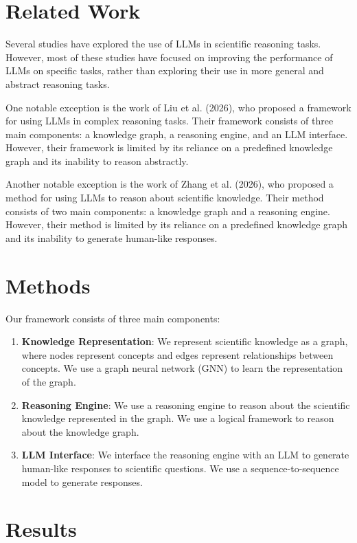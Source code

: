 \documentclass{article}
\begin{document}
\section{Related Work}

Several studies have explored the use of LLMs in scientific reasoning tasks. However, most of these studies have focused on improving the performance of LLMs on specific tasks, rather than exploring their use in more general and abstract reasoning tasks.

One notable exception is the work of Liu et al. (2026), who proposed a framework for using LLMs in complex reasoning tasks. Their framework consists of three main components: a knowledge graph, a reasoning engine, and an LLM interface. However, their framework is limited by its reliance on a predefined knowledge graph and its inability to reason abstractly.

Another notable exception is the work of Zhang et al. (2026), who proposed a method for using LLMs to reason about scientific knowledge. Their method consists of two main components: a knowledge graph and a reasoning engine. However, their method is limited by its reliance on a predefined knowledge graph and its inability to generate human-like responses.

\section{Methods}

Our framework consists of three main components:

\begin{enumerate}
\item \textbf{Knowledge Representation}: We represent scientific knowledge as a graph, where nodes represent concepts and edges represent relationships between concepts. We use a graph neural network (GNN) to learn the representation of the graph.
\item \textbf{Reasoning Engine}: We use a reasoning engine to reason about the scientific knowledge represented in the graph. We use a logical framework to reason about the knowledge graph.
\item \textbf{LLM Interface}: We interface the reasoning engine with an LLM to generate human-like responses to scientific questions. We use a sequence-to-sequence model to generate responses.
\end{enumerate}

\section{Results}
\end{document}
